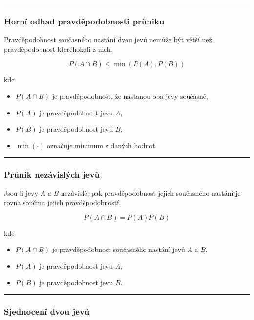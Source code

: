 \documentclass[a4paper, 11pt]{article}
\begin{document}
\noindent\hrule\medskip

\subsubsection{Horní odhad pravděpodobnosti průniku}

Pravděpodobnost současného nastání dvou jevů nemůže být větší
než pravděpodobnost kteréhokoli z nich.

\begin{equation*}
	P(A \cap B) \le \min(P(A), P(B))
\end{equation*}

kde

\begin{itemize}[noitemsep]
	\item $P(A \cap B)$ je pravděpodobnost, že nastanou oba jevy současně,
	\item $P(A)$ je pravděpodobnost jevu $A$,
	\item $P(B)$ je pravděpodobnost jevu $B$,
	\item $\min(\cdot)$ označuje minimum z daných hodnot.
\end{itemize}

\noindent\hrule\medskip

\subsubsection{Průnik nezávislých jevů}

Jsou-li jevy $A$ a $B$ nezávislé, pak pravděpodobnost jejich
současného nastání je rovna součinu jejich pravděpodobností.

\begin{equation*}
	P(A \cap B) = P(A)P(B)
\end{equation*}

kde

\begin{itemize}[noitemsep]
	\item $P(A \cap B)$ je pravděpodobnost současného nastání jevů $A$ a $B$,
	\item $P(A)$ je pravděpodobnost jevu $A$,
	\item $P(B)$ je pravděpodobnost jevu $B$.
\end{itemize}

\noindent\hrule\medskip

\subsubsection{Sjednocení dvou jevů}
\end{document}
